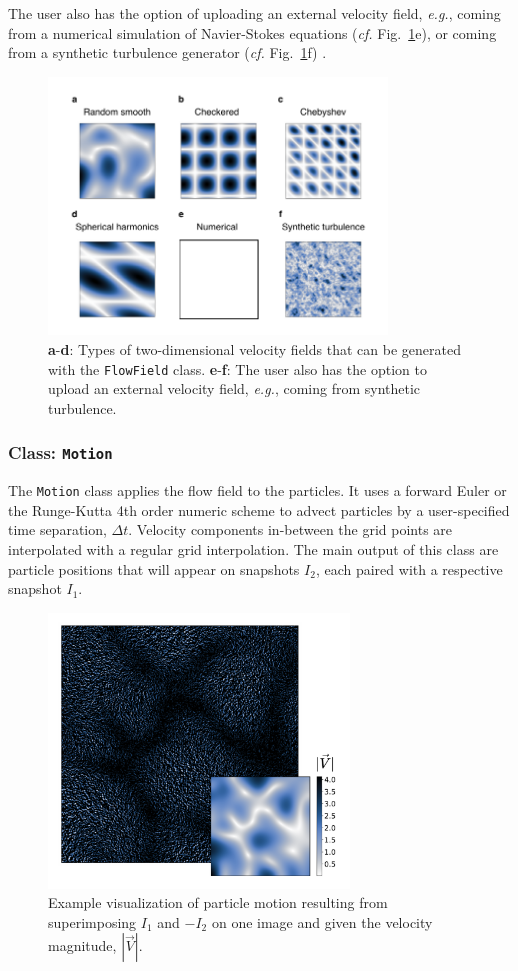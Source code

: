 \documentclass[a4paper,fleqn]{cas-dc}
\begin{document}
The user also has the option of uploading an external velocity field, \textit{e.g.}, coming from a numerical simulation of Navier-Stokes equations (\textit{cf.} Fig.~\ref{fig:velocity-fields}e), or coming from a synthetic turbulence generator (\textit{cf.} Fig.~\ref{fig:velocity-fields}f) \citep{saad2017scalable, richards2018fast}.

\begin{figure}[t]
\centering
\includegraphics[width=9cm]{velocity-fields.pdf}
\caption{\textbf{a}-\textbf{d}: Types of two-dimensional velocity fields that can be generated with the \texttt{FlowField} class. \textbf{e}-\textbf{f}: The user also has the option to upload an external velocity field, \textit{e.g.}, coming from synthetic turbulence.}
\label{fig:velocity-fields}
\end{figure}

\subsubsection{Class: \texttt{Motion}} \label{sec:class-Motion}

The \texttt{Motion} class applies the flow field to the particles. It uses a forward Euler or the Runge-Kutta 4th order numeric scheme to advect particles by a user-specified time separation, $\Delta t$. Velocity components in-between the grid points are interpolated with a regular grid interpolation. The main output of this class are particle positions that will appear on snapshots $I_2$, each paired with a respective snapshot $I_1$.

\begin{figure}[t]
\centering
\includegraphics[width=8cm]{motion-image.pdf}
\caption{Example visualization of particle motion resulting from superimposing $I_1$ and $-I_2$ on one image and given the velocity magnitude, $|\vec{V}|$.}
\label{fig:particle-motion}
\end{figure}
\end{document}
